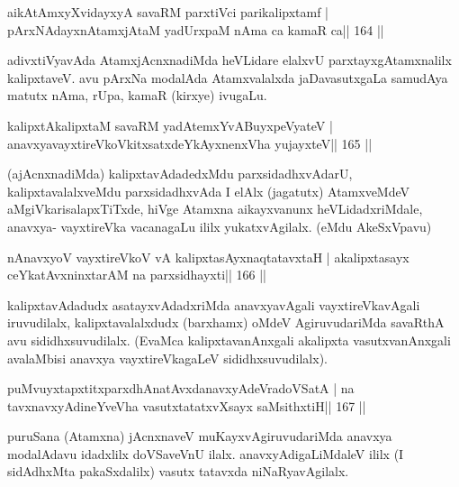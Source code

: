 \begin{shl}
aikAtAmxyXvidayxyA savaRM parxtiVci parikalipxtamf |
pArxNAdayxnAtamxjAtaM yadUrxpaM nAma ca kamaR ca\hfill || 164 ||
\end{shl}

\begin{artha}
adivxtiVyavAda AtamxjAcnxnadiMda heVLidare elalxvU parxtayxgAtamxnalilx  kalipxtaveV. avu pArxNa modalAda Atamxvalalxda jaDavasutxgaLa samudAya matutx nAma, rUpa, kamaR (kirxye) ivugaLu.
\end{artha}

\begin{shl}
kalipxtAkalipxtaM savaRM yadA\s\s temxYvABuyxpeVyateV |
anavxyavayxtireVkoVkitxsatxdeYkAyxnenxVha yujayxteV\hfill || 165 ||
\end{shl}

\begin{artha}
(ajAcnxnadiMda) kalipxtavAdadedxMdu parxsidadhxvAdarU, 
kalipxtavalalxveMdu parxsidadhx\-vAda I elAlx (jagatutx) AtamxveMdeV aMgiVkarisalapxTiTxde, hiVge Atamxna aikayxvanunx heVLidadxriMdale, anavxya- vayxtireVka vacanagaLu ililx yukatxvAgilalx. (eMdu AkeSxVpavu)
\end{artha}


\begin{shl}
nAnavxyoV vayxtireVkoV vA kalipxtasAyxnaqtatavxtaH |
akalipxtasayx ceYkatAvxninxtarAM na parxsidhayxti\hfill || 166 ||
\end{shl}

\begin{artha}
kalipxtavAdadudx asatayxvAdadxriMda anavxyavAgali vayxtireVkavAgali 
iruvudilalx, kalipxtavalalxdudx (barxhamx) oMdeV AgiruvudariMda savaRthA avu sididhxsuvudilalx. (EvaMca kalipxtavanAnxgali akalipxta vasutxvanAnxgali avalaMbisi anavxya vayxtireVkagaLeV sididhxsuvudilalx).
\end{artha}


\begin{shl}
puMvuyxtapxtitxparxdhAnatAvxdanavxyAdeVradoVSatA |
na tavxnavxyAdineYveVha vasutxtatatxvXsayx saMsithxtiH\hfill || 167 ||
\end{shl}

\begin{artha}
puruSana (Atamxna) jAcnxnaveV muKayxvAgiruvudariMda anavxya modalAdavu  idadxlilx doVSaveVnU ilalx. anavxyAdigaLiMdaleV ililx (I sidAdhxMta pakaSxdalilx) vasutx tatavxda niNaRyavAgilalx.
\end{artha}

